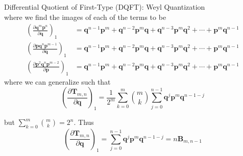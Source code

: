\documentclass[aspectratio=169]{beamer}
\begin{document}
\begin{frame}[allowframebreaks]{Differential Quotient of First-Type (DQFT): Weyl Quantization}
\begin{equation}
		\end{equation}
		where we find the images of each of the terms to be
		\begin{align}
			\left(\frac{\partial\textbf{q}^m\textbf{p}^n}{\partial\textbf{q}}\right)_1&=\textbf{q}^{n-1}\textbf{p}^m+\textbf{q}^{n-2}\textbf{p}^m\textbf{q}+\textbf{q}^{n-3}\textbf{p}^m\textbf{q}^{2}+\cdots+\textbf{p}^m\textbf{q}^{n-1} \\
			\left(\frac{\partial\textbf{p}\textbf{q}^n\textbf{p}^{m-1}}{\partial\textbf{q}}\right)_1&=\textbf{q}^{n-1}\textbf{p}^m+\textbf{q}^{n-2}\textbf{p}^m\textbf{q}+\textbf{q}^{n-3}\textbf{p}^m\textbf{q}^{2}+\cdots+\textbf{p}^m\textbf{q}^{n-1} \\
			\left(\frac{\partial\textbf{p}^2\textbf{q}^n\textbf{p}^{m-2}}{\partial\textbf{p}}\right)_1&=\textbf{q}^{n-1}\textbf{p}^m+\textbf{q}^{n-2}\textbf{p}^m\textbf{q}+\textbf{q}^{n-3}\textbf{p}^m\textbf{q}^{2}+\cdots+\textbf{p}^m\textbf{q}^{n-1}
		\end{align}
		where we can generalize such that
		\begin{equation}
			\left(\frac{\partial\textbf{T}_{m,n}}{\partial\textbf{q}}\right)_1=\frac{1}{2^m}\sum_{k=0}^m\binom{m}{k}\sum_{j=0}^{n-1}\textbf{q}^j\textbf{p}^m\textbf{q}^{n-1-j}
		\end{equation}
		
		\framebreak
		but $\displaystyle\sum_{k=0}^m\binom{m}{k}=2^n$. Thus
		\begin{equation}
			\left(\frac{\partial\textbf{T}_{m,n}}{\partial\textbf{q}}\right)_1=\sum_{j=0}^{n-1}\textbf{q}^j\textbf{p}^m\textbf{q}^{n-1-j}=n\textbf{B}_{m,n-1}
		\end{equation}
	\end{frame}
	
\end{document}
